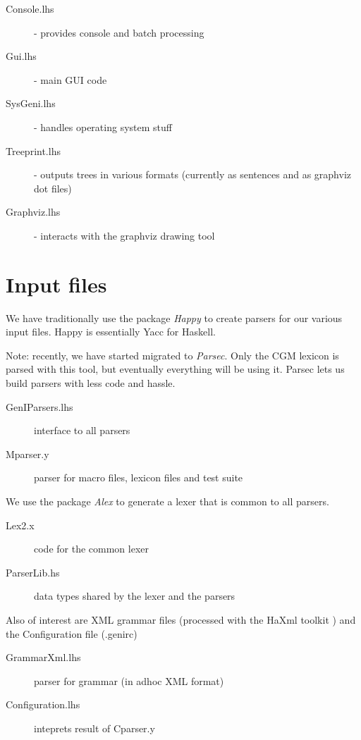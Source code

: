 \documentclass[a4paper,11pt]{report}
\begin{document}
\begin{description}
 \item[Console.lhs] - provides console and batch processing
 \item[Gui.lhs] - main GUI code 
 \item[SysGeni.lhs] - handles operating system stuff
 \item[Treeprint.lhs] - outputs trees in various formats 
                        (currently as sentences and as graphviz dot
                        files)
 \item[Graphviz.lhs] - interacts with the graphviz drawing tool
\end{description}

\section{Input files}

We have traditionally use the package \textit{Happy} to create parsers
for our various input files.  Happy is essentially Yacc for Haskell.

Note: recently, we have started migrated to \textit{Parsec}.  Only 
the CGM lexicon is parsed with this tool, but eventually everything
will be using it.  Parsec lets us build parsers with less code and
hassle.

\begin{description}
 \item[GenIParsers.lhs] interface to all parsers
 \item[Mparser.y] parser for macro files, lexicon files and test suite
\end{description}

We use the package \textit{Alex} to generate a lexer that is common to
all parsers.

\begin{description}
 \item[Lex2.x] code for the common lexer
 \item[ParserLib.hs] data types shared by the lexer and the parsers 
\end{description}

Also of interest are XML grammar files (processed with the HaXml toolkit
) and the Configuration file (.genirc)

\begin{description}
 \item[GrammarXml.lhs] parser for grammar (in adhoc XML format)
 \item[Configuration.lhs] inteprets result of Cparser.y
\end{description}
\end{document}
